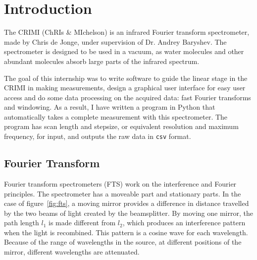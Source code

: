 
\section{Introduction}
The CRIMI (ChRIs $\&$ MIchelson) is an infrared Fourier transform spectrometer, made by Chris de Jonge, under supervision of Dr. Andrey Baryshev. The spectrometer is designed to be used in a vacuum, as water molecules and other abundant molecules absorb large parts of the infrared spectrum.

The goal of this internship was to write software to guide the linear stage in the CRIMI in making measurements, design a graphical user interface for easy user access and do some data processing on the acquired data: fast Fourier transforms and windowing. As a result, I have written a program in Python that automatically takes a complete measurement with this spectrometer. The program has scan length and stepsize, or equivalent resolution and maximum frequency, for input, and outputs the raw data in \verb!csv! format.


\subsection{Fourier Transform}

Fourier transform spectrometers (FTS) work on the interference and Fourier principles. The spectrometer has a moveable part and stationary parts. In the case of figure~\ref{fig:fts}, a moving mirror provides a difference in distance travelled by the two beams of light created by the beamsplitter. By moving one mirror, the path length $l_1$ is made different from $l_2$, which produces an interference pattern when the light is recombined. This pattern is a cosine wave for each wavelength. Because of the range of wavelengths in the source, at different positions of the mirror, different wavelengths are attenuated.

